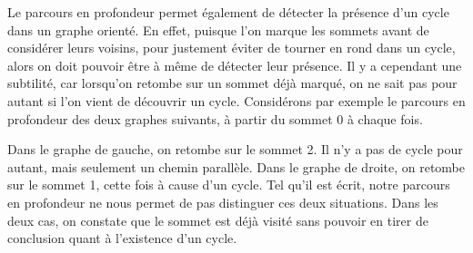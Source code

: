 \documentclass{magnolia}
\begin{document}
Le parcours en profondeur permet également de détecter la présence d'un cycle dans un
graphe orienté. En effet, puisque l'on marque les sommets avant de considérer leurs voisins,
pour justement éviter de tourner en rond dans un cycle, alors on doit pouvoir être à même
de détecter leur présence. Il y a cependant une subtilité, car lorsqu'on retombe
sur un sommet déjà marqué, on ne sait pas pour autant si l'on vient de découvrir un cycle.
Considérons par exemple le parcours en profondeur des deux graphes suivants, à partir
du sommet 0 à chaque fois.

\begin{center}
\hspace{2cm}
\end{center}
\noindent
Dans le graphe de gauche, on retombe sur le sommet 2. Il n'y a pas de cycle pour autant,
mais seulement un chemin parallèle. Dans le graphe de droite, on retombe sur
le sommet 1, cette fois à cause d'un cycle. Tel qu'il est écrit, notre parcours en
profondeur ne nous permet de pas distinguer ces deux situations. Dans les deux cas, 
on constate que le sommet est déjà visité sans pouvoir en tirer de conclusion quant à
l'existence d'un cycle.\\
\end{document}

